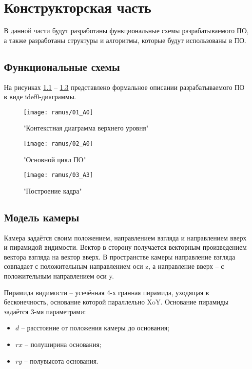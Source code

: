 \chapter{Конструкторская часть}

В данной части будут разработаны функциональные схемы разрабатываемого ПО, а также разработаны структуры и алгоритмы, которые будут использованы в ПО.

\section{Функциональные схемы} 

На рисунках \ref{fig:A0} -- \ref{fig:A3} представлено формальное описании разрабатываемого ПО в виде idef0-диаграммы.

\begin{figure}[H]
	\centering
	\texttt{[image: ramus/01\_A0]}
	\caption{"Контекстная диаграмма верхнего уровня"}
	\label{fig:A0}
\end{figure}

\begin{figure}[H]
	\centering
	\texttt{[image: ramus/02\_A0]}
	\caption{"Основной цикл ПО"}
	\label{fig:A1}
\end{figure}

\begin{figure}[H]
	\centering
	\texttt{[image: ramus/03\_A3]}
	\caption{"Построение кадра"}
	\label{fig:A3}
\end{figure}

\section{Модель камеры}

Камера задаётся своим положением, направлением взгляда и направлением вверх и пирамидой видимости. Вектор в сторону получается векторным произведением вектора взгляда на вектор вверх. В пространстве камеры направление взгляда совпадает с положительным направлением оси z, а направление вверх -- с положительным направлением оси y.


Пирамида видимости -- усечённая 4-х гранная пирамида, уходящая в бесконечность, основание которой параллельно XoY. Основание пирамиды задаётся 3-мя параметрами:

\begin{itemize}
	\item $d$ -- расстояние от положения камеры до основания;
	\item $rx$ -- полуширина основания;
	\item $ry$ -- полувысота основания.
\end{itemize}

